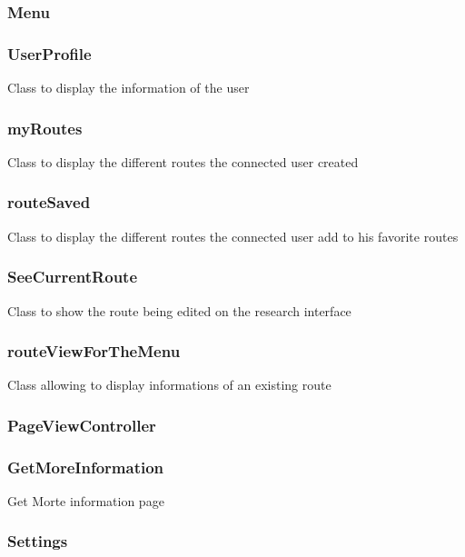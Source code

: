 \subsubsection{Menu}

\subsubsection{UserProfile}

Class to display the information of the user

\subsubsection{myRoutes}

Class to display the different routes the connected user created

\subsubsection{routeSaved}

Class to display the different routes the connected user add to his favorite routes

\subsubsection{SeeCurrentRoute}

Class to show the route being edited on the research interface

\subsubsection{routeViewForTheMenu}

Class allowing to display informations of an existing route

\subsubsection{PageViewController}

\subsubsection{GetMoreInformation}

Get Morte information page

\subsubsection{Settings}

